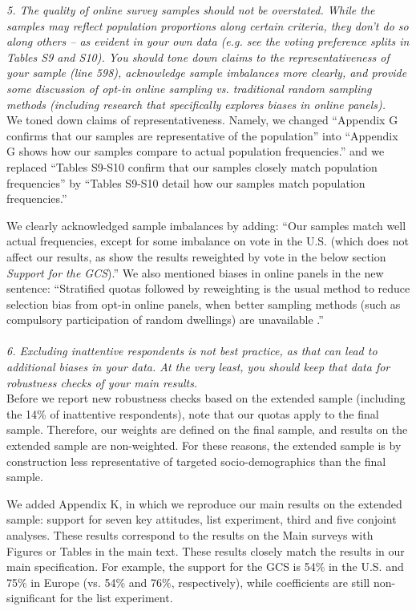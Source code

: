 \documentclass[12pt,english]{article}
\begin{document}
\textit{5. The quality of online survey samples should not be overstated. While the samples may reflect population proportions along certain criteria, they don’t do so along others – as evident in your own data (e.g. see the voting preference splits in Tables S9 and S10). You should tone down claims to the representativeness of your sample (line 598), acknowledge sample imbalances more clearly, and provide some discussion of opt-in online sampling vs. traditional random sampling methods (including research that specifically explores biases in online panels).}~\\

We toned down claims of representativeness. Namely, we changed ``Appendix G confirms that our samples are representative of the population'' into ``Appendix G shows how our samples compare to actual population frequencies.'' and we replaced ``Tables S9-S10 confirm that our samples closely match population frequencies'' by ``Tables S9-S10 %
detail how our samples match population frequencies.'' 

We clearly acknowledged sample imbalances by adding: ``Our samples match well actual frequencies, except for some imbalance on vote in the U.S. (which does not affect our results, as show the results reweighted by vote in the below section \textit{Support for the GCS}).'' We also mentioned biases in online panels in the new sentence: ``Stratified quotas followed by reweighting is the usual method to reduce selection bias from opt-in online panels, when better sampling methods (such as compulsory participation of random dwellings) are unavailable \citep{scherpenzeel_how_2010}.''
~\\ ~\\

\textit{6. Excluding inattentive respondents is not best practice, as that can lead to additional biases in your data. At the very least, you should keep that data for robustness checks of your main results.}~\\

Before we report new robustness checks based on the extended sample (including the 14\% of inattentive respondents), note that our quotas apply to the final sample. Therefore, our weights are defined on the final sample, and results on the extended sample are non-weighted. For these reasons, the extended sample is by construction less representative of targeted socio-demographics than the final sample.

We added Appendix K, in which we reproduce our main results on the extended sample: support for seven key attitudes, list experiment, third and five conjoint analyses. These results correspond to the results on the Main surveys with Figures or Tables in the main text. These results closely match the results in our main specification. For example, the support for the GCS is 54\% in the U.S. and 75\% in Europe (vs. 54\% and 76\%, respectively), while coefficients are still non-significant for the list experiment.
~\\ ~\\
\end{document}
